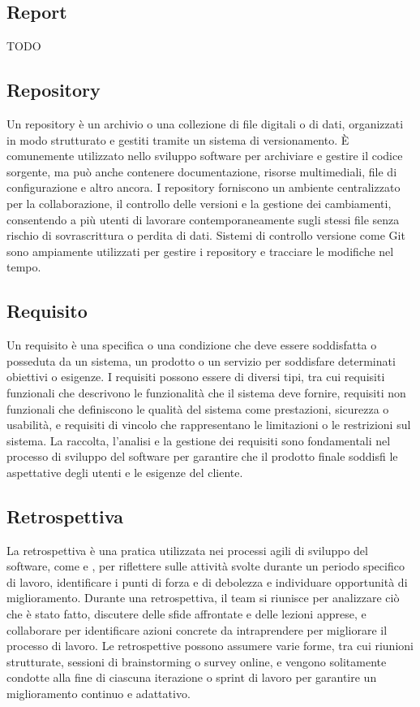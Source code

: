\vspace{2em}
\subsection*{Report}
TODO

\vspace{2em}
\subsection*{Repository}
Un repository è un archivio o una collezione di file digitali o di dati, organizzati in modo strutturato e gestiti tramite un sistema di versionamento. È comunemente utilizzato nello sviluppo software per archiviare e gestire il codice sorgente, ma può anche contenere documentazione, risorse multimediali, file di configurazione e altro ancora. I repository forniscono un ambiente centralizzato per la collaborazione, il controllo delle versioni e la gestione dei cambiamenti, consentendo a più utenti di lavorare contemporaneamente sugli stessi file senza rischio di sovrascrittura o perdita di dati. Sistemi di controllo versione come Git sono ampiamente utilizzati per gestire i repository e tracciare le modifiche nel tempo.

\vspace{2em}
\subsection*{Requisito}
Un requisito è una specifica o una condizione che deve essere soddisfatta o posseduta da un sistema, un prodotto o un servizio per soddisfare determinati obiettivi o esigenze. I requisiti possono essere di diversi tipi, tra cui requisiti funzionali che descrivono le funzionalità che il sistema deve fornire, requisiti non funzionali che definiscono le qualità del sistema come prestazioni, sicurezza o usabilità, e requisiti di vincolo che rappresentano le limitazioni o le restrizioni sul sistema. La raccolta, l'analisi e la gestione dei requisiti sono fondamentali nel processo di sviluppo del software per garantire che il prodotto finale soddisfi le aspettative degli utenti e le esigenze del cliente.

\vspace{2em}
\subsection*{Retrospettiva}
La retrospettiva è una pratica utilizzata nei processi agili di sviluppo del software, come  e , per riflettere sulle attività svolte durante un periodo specifico di lavoro, identificare i punti di forza e di debolezza e individuare opportunità di miglioramento. Durante una retrospettiva, il team si riunisce per analizzare ciò che è stato fatto, discutere delle sfide affrontate e delle lezioni apprese, e collaborare per identificare azioni concrete da intraprendere per migliorare il processo di lavoro. Le retrospettive possono assumere varie forme, tra cui riunioni strutturate, sessioni di brainstorming o survey online, e vengono solitamente condotte alla fine di ciascuna iterazione o sprint di lavoro per garantire un miglioramento continuo e adattativo.

